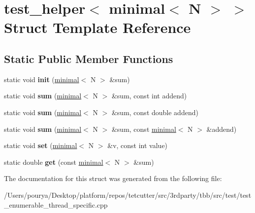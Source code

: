 \hypertarget{structtest__helper_3_01minimal_3_01N_01_4_01_4}{}\section{test\+\_\+helper$<$ minimal$<$ N $>$ $>$ Struct Template Reference}
\label{structtest__helper_3_01minimal_3_01N_01_4_01_4}
\subsection*{Static Public Member Functions}
\begin{DoxyCompactItemize}
\item 
\hypertarget{structtest__helper_3_01minimal_3_01N_01_4_01_4_a253b60c22a1bb9f3d38df35a8e5f068f}{}static void {\bfseries init} (\hyperlink{classminimal}{minimal}$<$ N $>$ \&sum)\label{structtest__helper_3_01minimal_3_01N_01_4_01_4_a253b60c22a1bb9f3d38df35a8e5f068f}

\item 
\hypertarget{structtest__helper_3_01minimal_3_01N_01_4_01_4_a0c826611c5cb535e9be8fc724f852d68}{}static void {\bfseries sum} (\hyperlink{classminimal}{minimal}$<$ N $>$ \&sum, const int addend)\label{structtest__helper_3_01minimal_3_01N_01_4_01_4_a0c826611c5cb535e9be8fc724f852d68}

\item 
\hypertarget{structtest__helper_3_01minimal_3_01N_01_4_01_4_a5adb2b30ebd9157b3746ef4f6b667cf9}{}static void {\bfseries sum} (\hyperlink{classminimal}{minimal}$<$ N $>$ \&sum, const double addend)\label{structtest__helper_3_01minimal_3_01N_01_4_01_4_a5adb2b30ebd9157b3746ef4f6b667cf9}

\item 
\hypertarget{structtest__helper_3_01minimal_3_01N_01_4_01_4_a79dfb2007a136f8f4462812a30dd4f23}{}static void {\bfseries sum} (\hyperlink{classminimal}{minimal}$<$ N $>$ \&sum, const \hyperlink{classminimal}{minimal}$<$ N $>$ \&addend)\label{structtest__helper_3_01minimal_3_01N_01_4_01_4_a79dfb2007a136f8f4462812a30dd4f23}

\item 
\hypertarget{structtest__helper_3_01minimal_3_01N_01_4_01_4_a320925ecf3c272f80b3a6dcf2f5972f0}{}static void {\bfseries set} (\hyperlink{classminimal}{minimal}$<$ N $>$ \&v, const int value)\label{structtest__helper_3_01minimal_3_01N_01_4_01_4_a320925ecf3c272f80b3a6dcf2f5972f0}

\item 
\hypertarget{structtest__helper_3_01minimal_3_01N_01_4_01_4_ad3161b4be237bb30b9875b461bce7336}{}static double {\bfseries get} (const \hyperlink{classminimal}{minimal}$<$ N $>$ \&sum)\label{structtest__helper_3_01minimal_3_01N_01_4_01_4_ad3161b4be237bb30b9875b461bce7336}

\end{DoxyCompactItemize}


The documentation for this struct was generated from the following file\+:\begin{DoxyCompactItemize}
\item 
/\+Users/pourya/\+Desktop/platform/repos/tetcutter/src/3rdparty/tbb/src/test/test\+\_\+enumerable\+\_\+thread\+\_\+specific.\+cpp\end{DoxyCompactItemize}
